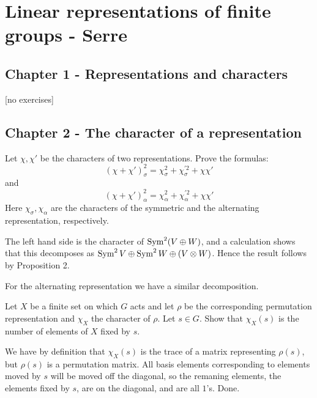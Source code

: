 \documentclass[11pt, english]{article}
\begin{document}

\section{Linear representations of finite groups - Serre}

\subsection{Chapter 1 - Representations and characters}

[no exercises]

\subsection{Chapter 2 - The character of a representation}

\begin{exc}[Exercise 2.1]
  Let $\chi,\chi'$ be the characters of two representations. Prove the formulas:
\[
(\chi+\chi')_\sigma^2 = \chi_\sigma^2 + \chi_\sigma^{'2}+\chi \chi'
\]
and 
\[
(\chi+\chi')_\alpha^2 = \chi_\alpha^2 + \chi_\alpha^{'2}+\chi \chi'
\]
Here $\chi_\sigma,\chi_\alpha$ are the characters of the symmetric and the alternating representation, respectively.
\end{exc}
\begin{sol}
The left hand side is the character of $\operatorname{Sym}^2(V \oplus W)$, and a calculation shows that this decomposes as $\operatorname{Sym}^2 V \oplus \operatorname{Sym}^2 W \oplus (V \otimes W)$. Hence the result follows by Proposition 2.

For the alternating representation we have a similar decomposition.
\end{sol}

\begin{exc}[Exercise 2.2]
  Let $X$ be a finite set on which $G$ acts and let $\rho$ be the corresponding permutation representation and $\chi_X$ the character of $\rho$. Let $s \in G$. Show that $\chi_X(s)$ is the number of elements of $X$ fixed by $s$.
\end{exc}

\begin{sol}
 We have by definition that $\chi_X(s)$ is the trace of a matrix representing $\rho(s)$, but $\rho(s)$ is a permutation matrix. All basis elements corresponding to elements moved by $s$ will be moved off the diagonal, so the remaning elements, the elements fixed by $s$, are on the diagonal, and are all $1$'s. Done.
\end{sol}
\end{document}
